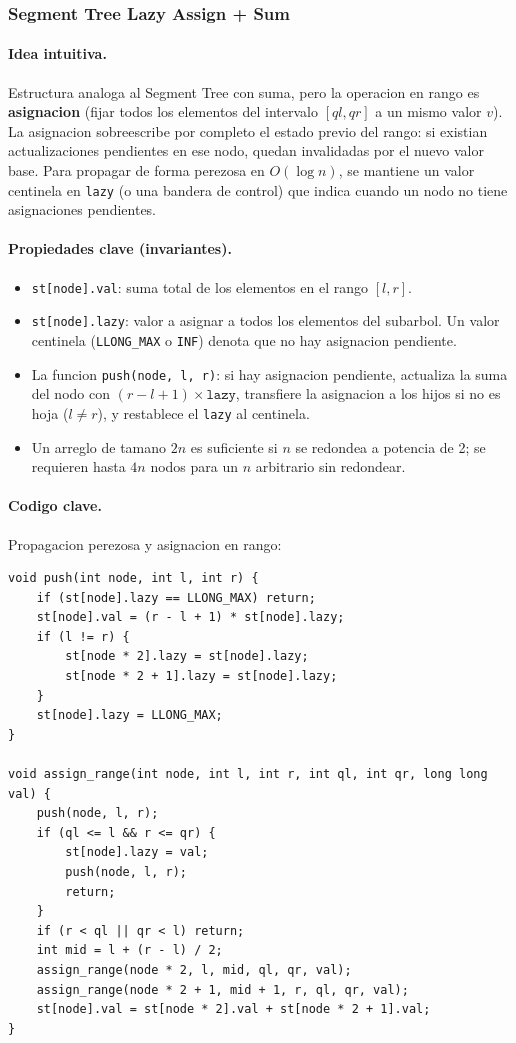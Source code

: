 \subsubsection{Segment Tree Lazy Assign + Sum}

\paragraph{Idea intuitiva.}
Estructura analoga al Segment Tree con suma, pero la operacion en rango es \textbf{asignacion} (fijar todos los elementos del intervalo $[ql, qr]$ a un mismo valor $v$). La asignacion sobreescribe por completo el estado previo del rango: si existian actualizaciones pendientes en ese nodo, quedan invalidadas por el nuevo valor base. Para propagar de forma perezosa en $O(\log n)$, se mantiene un valor centinela en \texttt{lazy} (o una bandera de control) que indica cuando un nodo no tiene asignaciones pendientes.

\paragraph{Propiedades clave (invariantes).}
\begin{itemize}\setlength\itemsep{0pt}
	\item \texttt{st[node].val}: suma total de los elementos en el rango $[l, r]$.
	\item \texttt{st[node].lazy}: valor a asignar a todos los elementos del subarbol. Un valor centinela (\texttt{LLONG\_MAX} o \texttt{INF}) denota que no hay asignacion pendiente.
	\item La funcion \texttt{push(node, l, r)}: si hay asignacion pendiente, actualiza la suma del nodo con $(r - l + 1) \times \texttt{lazy}$, transfiere la asignacion a los hijos si no es hoja ($l \ne r$), y restablece el \texttt{lazy} al centinela.
	\item Un arreglo de tamano $2n$ es suficiente si $n$ se redondea a potencia de 2; se requieren hasta $4n$ nodos para un $n$ arbitrario sin redondear.
\end{itemize}

\paragraph{Codigo clave.}
Propagacion perezosa y asignacion en rango:
\begin{verbatim}
void push(int node, int l, int r) {
    if (st[node].lazy == LLONG_MAX) return;
    st[node].val = (r - l + 1) * st[node].lazy;
    if (l != r) {
        st[node * 2].lazy = st[node].lazy;
        st[node * 2 + 1].lazy = st[node].lazy;
    }
    st[node].lazy = LLONG_MAX;
}

void assign_range(int node, int l, int r, int ql, int qr, long long val) {
    push(node, l, r);
    if (ql <= l && r <= qr) {
        st[node].lazy = val;
        push(node, l, r);
        return;
    }
    if (r < ql || qr < l) return;
    int mid = l + (r - l) / 2;
    assign_range(node * 2, l, mid, ql, qr, val);
    assign_range(node * 2 + 1, mid + 1, r, ql, qr, val);
    st[node].val = st[node * 2].val + st[node * 2 + 1].val;
}
\end{verbatim}

